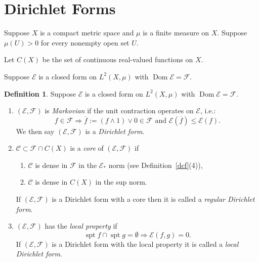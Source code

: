 \documentclass[a4paper]{amsart}
\theoremstyle{plain}
\theoremstyle{definition}
\newtheorem{definition}[theorem]{Definition}%
\theoremstyle{remark}
\DeclareMathOperator{\spt}{spt}
\DeclareMathOperator{\dom}{Dom}
\begin{document}
\section{\textbf{Dirichlet Forms}}

Suppose $ X $ is a compact metric space and $ \mu $ is a finite measure on $ X $.  Suppose $ \mu(U)>0 $ for every nonempty open set $ U $.

Let $ C(X) $ be the set of continuous real-valued functions on $ X $.

Suppose $ \mathcal{E} $ is a closed form on $ L^2(X,\mu) $ with $ \dom \mathcal{E} = \mathcal{F} $.

\begin{definition}\label{dfdir} Suppose $ \mathcal{E} $ is a closed form on $ L^2(X,\mu) $ with $ \dom \mathcal{E} = \mathcal{F} $.


\begin{enumerate}

\item $(\mathcal{E}, \mathcal{F} ) $ is \emph{Markovian} if the unit contraction operates on $ \mathcal{E} $, i.e.:
\[
f \in \mathcal{F} \Longrightarrow \overline{f} := (f\wedge 1)\vee 0 \in \mathcal{F} \text{ and } 
\mathcal{E} (\overline{f})\leq \mathcal{E} (f) .
\]
We then say $ (\mathcal{E}, \mathcal{F} ) $ is a \emph{Dirichlet form}.
\item $ \mathcal{C} \subset \mathcal{F} \cap C(X) $ is a \emph{core}  of $ (\mathcal{E}, \mathcal{F} ) $ if
\begin{enumerate}

\item $ \mathcal{C} $ is dense in $ \mathcal{F} $ in the $ \mathcal{E}_* $ norm (see Definition~\ref{dcf}(4)),
\item $ \mathcal{C} $ is dense in $ C(X) $ in the sup norm.
\end{enumerate}
If $ (\mathcal{E}, \mathcal{F} ) $ is a Dirichlet form with a core then it is called a \emph{regular Dirichlet form}.

\item $ (\mathcal{E}, \mathcal{F} ) $ has the \emph{local property} if 
\[
\spt f \cap \spt g = \emptyset \Longrightarrow \mathcal{E} (f,g) = 0 .
\]
If $ (\mathcal{E}, \mathcal{F} ) $ is a Dirichlet form with the local property it is called a \emph{local Dirichlet form}.
\end{enumerate} 
\end{definition} 
\end{document}
